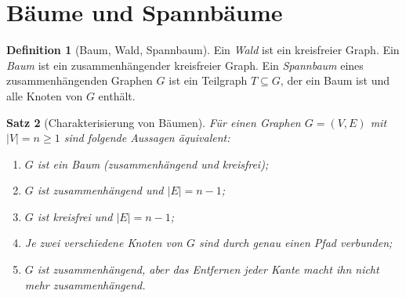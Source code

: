\documentclass[12pt,a4paper]{amsart}
\newtheorem{theorem}{Satz}[section]
\theoremstyle{definition}
\newtheorem{definition}[theorem]{Definition}
\theoremstyle{remark}
\begin{document}
\section{Bäume und Spannbäume}
\label{sec:baeume}

\begin{definition}[Baum, Wald, Spannbaum]
Ein \emph{Wald} ist ein kreisfreier Graph. Ein \emph{Baum} ist ein
zusammenhängender kreisfreier Graph. Ein \emph{Spannbaum} eines zusammen\-hängenden
Graphen $G$ ist ein Teilgraph $T \subseteq G$, der ein Baum ist und alle
Knoten von $G$ enthält.
\end{definition}

\begin{theorem}[Charakterisierung von Bäumen]
\label{satz:baum-char}
Für einen Graphen $G = (V, E)$ mit $|V| = n \ge 1$ sind folgende Aussagen
äquivalent:
\begin{enumerate}[label=\upshape(\roman*)]
  \item $G$ ist ein Baum (zusammenhängend und kreisfrei);
  \item $G$ ist zusammenhängend und $|E| = n - 1$;
  \item $G$ ist kreisfrei und $|E| = n - 1$;
  \item Je zwei verschiedene Knoten von $G$ sind durch genau einen Pfad
        verbunden;
  \item $G$ ist zusammenhängend, aber das Entfernen jeder Kante macht ihn
        nicht mehr zusammenhängend.
\end{enumerate}
\end{theorem}
\end{document}
